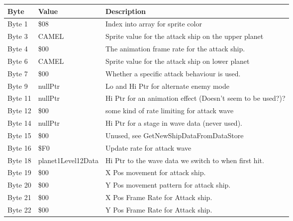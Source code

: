 \begin{figure}[H]
{\begin{adjustbox}{width=12cm}
\begin{tabular}{lll}
\toprule
 Byte    & Value                      & Description                                                        \\
\midrule
 Byte 1  & \$08                        & Index into array for sprite color                                  \\
 Byte 3  & CAMEL                      & Sprite value for the attack ship on the upper planet               \\
 Byte 4  & \$00                        & The animation frame rate for the attack ship.                      \\
 Byte 6  & CAMEL                      & Sprite value for the attack ship on lower planet                   \\
 Byte 7  & \$00                        & Whether a specific attack behaviour is used.                       \\
 Byte 9  & nullPtr                    & Lo and Hi Ptr for alternate enemy mode                             \\
 Byte 11 & nullPtr                    & Hi Ptr for an animation effect (Doesn't seem to be used?)?         \\
 Byte 12 & \$00                        & some kind of rate limiting for attack wave                         \\
 Byte 14 & nullPtr                    & Hi Ptr for a stage in wave data (never used).                      \\
 Byte 15 & \$00                        & Unused, see GetNewShipDataFromDataStore                            \\
 Byte 16 & \$F0                        & Update rate for attack wave                                        \\
 Byte 18 & planet1Level12Data         & Hi Ptr to the wave data we switch to when first hit.               \\
 Byte 19 & \$00                        & X Pos movement for attack ship.                                    \\
 Byte 20 & \$00                        & Y Pos movement pattern for attack ship.                            \\
 Byte 21 & \$00                        & X Pos Frame Rate for Attack ship.                                  \\
 Byte 22 & \$00                        & Y Pos Frame Rate for Attack ship.                                  \\

\end{tabular}
\end{adjustbox}}
\end{figure}
